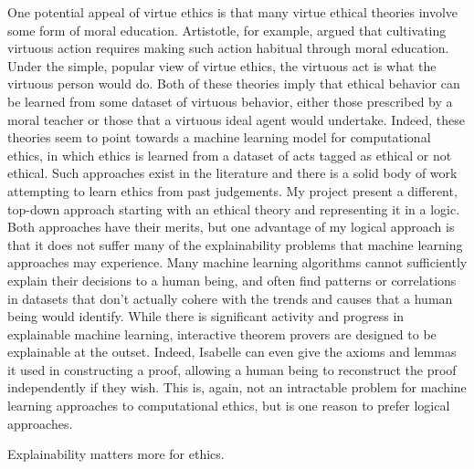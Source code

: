 \begin{isabellebody}
\begin{isamarkuptext}
One potential appeal of virtue ethics is that many virtue ethical theories involve some form of 
moral education. Artistotle, for example, argued that cultivating virtuous action requires making such
action habitual through moral education. Under the simple, popular view of virtue ethics, the virtuous
act is what the virtuous person would do. Both of these theories imply that ethical behavior can be
learned from some dataset of virtuous behavior, either those prescribed by a moral teacher or those that
a virtuous ideal agent would undertake. Indeed, these theories seem to point towards a machine learning
model for computational ethics, in which ethics is learned from a dataset of acts tagged as ethical
or not ethical. Such approaches exist in the literature and there is a solid body of work attempting 
to learn ethics from past judgements. My project present a different, top-down approach starting 
with an ethical theory and representing it in a logic. Both approaches have their merits, but one 
advantage of my logical approach is that it does not suffer many of the explainability problems that machine learning 
approaches may experience. Many machine learning algorithms cannot sufficiently explain their decisions
to a human being, and often find patterns or correlations in datasets that don't actually cohere with 
the trends and causes that a human being would identify. While there is significant activity and progress
in explainable machine learning, interactive theorem provers are designed to be explainable at the outset.
Indeed, Isabelle can even give the axioms and lemmas it used in constructing a proof, allowing a human 
being to reconstruct the proof independently if they wish. This is, again, not an intractable problem 
for machine learning approaches to computational ethics, but is one reason to prefer logical approaches.

Explainability matters more for ethics.%
\end{isamarkuptext}\isamarkuptrue%
%
\isadelimtheory
%
\endisadelimtheory
%
\isatagtheory
{}\isamarkupfalse%
%
\endisatagtheory
{\isafoldtheory}%
%
\isadelimtheory
%
\endisadelimtheory
\isanewline
%
\end{isabellebody}%
\endinput
